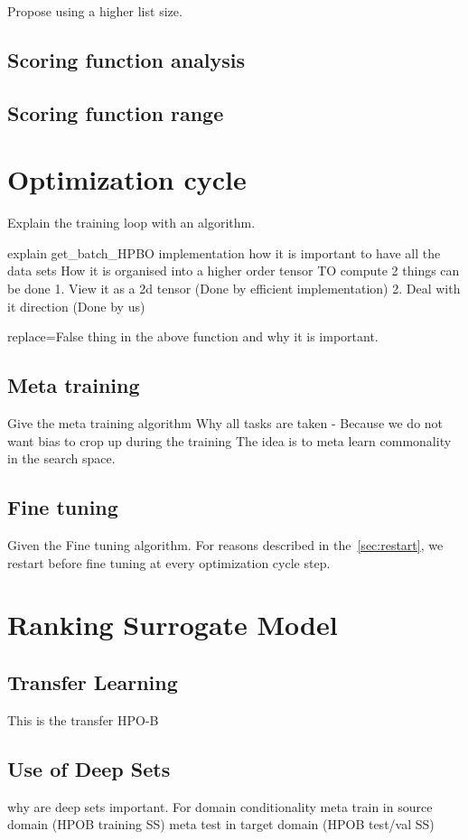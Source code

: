 \documentclass[11pt]{report}
\begin{document}
Propose using a higher list size.

\subsection{Scoring function analysis}

\subsection{Scoring function range}

\section{Optimization cycle}
Explain the training loop with an algorithm.

explain get\_batch\_HPBO implementation how it is important to have all the data sets
How it is organised into a higher order tensor
TO compute 2 things can be done
  1. View it as a 2d tensor (Done by efficient implementation)
     2. Deal with it direction (Done by us)

replace=False thing in the above function and why it is important.

\subsection{Meta training}
Give the meta training algorithm
Why all tasks are taken - 
Because we do not want bias to crop up during the training
The idea is to meta learn commonality in the search space.

\subsection{Fine tuning}\label{sec:rlfinetune}
Given the Fine tuning algorithm.
For reasons described in the~\ref{sec:restart},  we restart before fine tuning at every optimization cycle step.

\section{Ranking Surrogate Model}

\subsection{Transfer Learning}
This is the transfer HPO-B

\subsection{Use of Deep Sets}
why are deep sets important. 
For domain conditionality 
meta train in source domain (HPOB training SS)
meta test in target domain (HPOB test/val SS)
\end{document}
